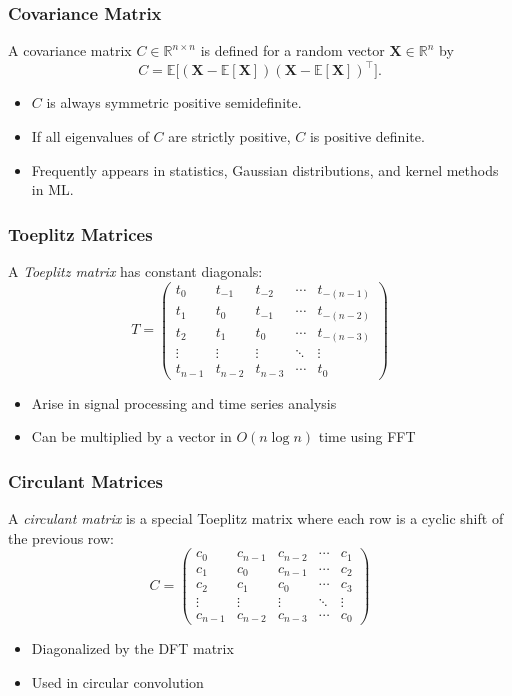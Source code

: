\subsubsection{Covariance Matrix}
A covariance matrix $C \in \mathbb{R}^{n \times n}$ is defined for a random vector 
$\mathbf{X} \in \mathbb{R}^n$ by
\[
C = \mathbb{E}\bigl[(\mathbf{X} - \mathbb{E}[\mathbf{X}])(\mathbf{X} - \mathbb{E}[\mathbf{X}])^\top\bigr].
\]
\begin{itemize}
    \item $C$ is always symmetric positive semidefinite.
    \item If all eigenvalues of $C$ are strictly positive, $C$ is positive definite.
    \item Frequently appears in statistics, Gaussian distributions, and kernel methods in ML.
\end{itemize}


\subsubsection{Toeplitz Matrices}
A \emph{Toeplitz matrix} has constant diagonals:
\[
T = \begin{pmatrix}
t_0 & t_{-1} & t_{-2} & \cdots & t_{-(n-1)} \\
t_1 & t_0 & t_{-1} & \cdots & t_{-(n-2)} \\
t_2 & t_1 & t_0 & \cdots & t_{-(n-3)} \\
\vdots & \vdots & \vdots & \ddots & \vdots \\
t_{n-1} & t_{n-2} & t_{n-3} & \cdots & t_0
\end{pmatrix}
\]
\begin{itemize}
    \item Arise in signal processing and time series analysis
    \item Can be multiplied by a vector in $O(n \log n)$ time using FFT
\end{itemize}

\subsubsection{Circulant Matrices}
A \emph{circulant matrix} is a special Toeplitz matrix where each row is a cyclic shift of the previous row:
\[
C = \begin{pmatrix}
c_0 & c_{n-1} & c_{n-2} & \cdots & c_1 \\
c_1 & c_0 & c_{n-1} & \cdots & c_2 \\
c_2 & c_1 & c_0 & \cdots & c_3 \\
\vdots & \vdots & \vdots & \ddots & \vdots \\
c_{n-1} & c_{n-2} & c_{n-3} & \cdots & c_0
\end{pmatrix}
\]
\begin{itemize}
    \item Diagonalized by the DFT matrix
    \item Used in circular convolution
\end{itemize}

